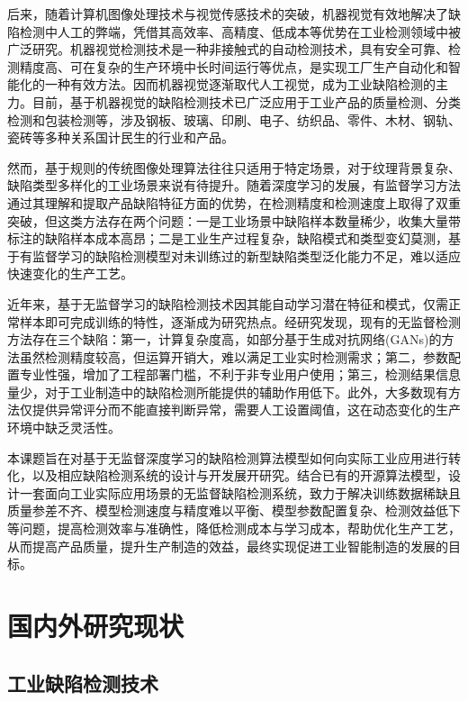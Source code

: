 \documentclass[
  ]{njuthesis}
\begin{document}
后来，随着计算机图像处理技术与视觉传感技术的突破，机器视觉有效地解决了缺陷检测中人工的弊端，凭借其高效率、高精度、低成本等优势在工业检测领域中被广泛研究\cite{[5]}。机器视觉检测技术是一种非接触式的自动检测技术，具有安全可靠、检测精度高、可在复杂的生产环境中长时间运行等优点，是实现工厂生产自动化和智能化的一种有效方法\cite{[6]}。因而机器视觉逐渐取代人工视觉，成为工业缺陷检测的主力。目前，基于机器视觉的缺陷检测技术已广泛应用于工业产品的质量检测、分类检测和包装检测等，涉及钢板、玻璃、印刷、电子、纺织品、零件、木材、钢轨、瓷砖等多种关系国计民生的行业和产品\cite{[7]}。

然而，基于规则的传统图像处理算法往往只适用于特定场景，对于纹理背景复杂、缺陷类型多样化的工业场景来说有待提升。随着深度学习的发展，有监督学习方法通过其理解和提取产品缺陷特征方面的优势，在检测精度和检测速度上取得了双重突破，但这类方法存在两个问题：一是工业场景中缺陷样本数量稀少，收集大量带标注的缺陷样本成本高昂；二是工业生产过程复杂，缺陷模式和类型变幻莫测，基于有监督学习的缺陷检测模型对未训练过的新型缺陷类型泛化能力不足，难以适应快速变化的生产工艺。

近年来，基于无监督学习的缺陷检测技术因其能自动学习潜在特征和模式，仅需正常样本即可完成训练的特性，逐渐成为研究热点。经研究发现，现有的无监督检测方法存在三个缺陷：第一，计算复杂度高，如部分基于生成对抗网络(GANs)的方法虽然检测精度较高，但运算开销大，难以满足工业实时检测需求；第二，参数配置专业性强，增加了工程部署门槛，不利于非专业用户使用；第三，检测结果信息量少，对于工业制造中的缺陷检测所能提供的辅助作用低下。此外，大多数现有方法仅提供异常评分而不能直接判断异常，需要人工设置阈值，这在动态变化的生产环境中缺乏灵活性。

本课题旨在对基于无监督深度学习的缺陷检测算法模型如何向实际工业应用进行转化，以及相应缺陷检测系统的设计与开发展开研究。结合已有的开源算法模型，设计一套面向工业实际应用场景的无监督缺陷检测系统，致力于解决训练数据稀缺且质量参差不齐、模型检测速度与精度难以平衡、模型参数配置复杂、检测效益低下等问题，提高检测效率与准确性，降低检测成本与学习成本，帮助优化生产工艺，从而提高产品质量，提升生产制造的效益，最终实现促进工业智能制造的发展的目标。

\section{国内外研究现状}

\subsection{工业缺陷检测技术}
\end{document}
